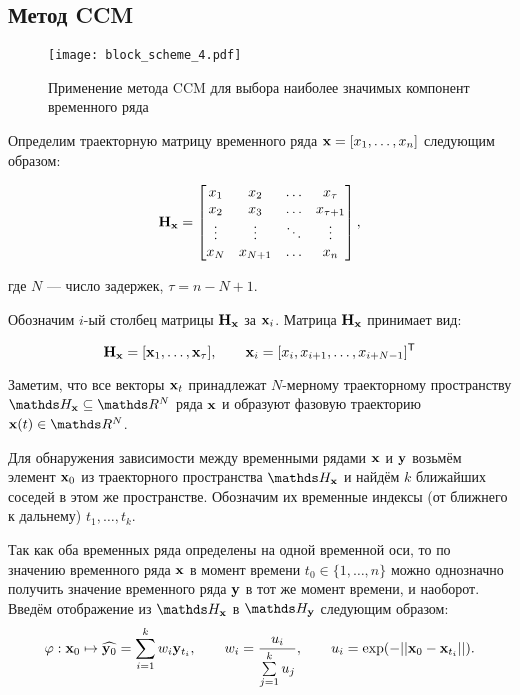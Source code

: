 \documentclass[a4paper, 12pt]{article}
\begin{document}
\subsection{Метод CCM}
\begin{figure}[bhtp]
	\texttt{[image: block\_scheme\_4.pdf]}
	\caption{Применение метода CCM для выбора наиболее значимых компонент временного ряда}
	\label{fig:schema}
\end{figure}

Определим траекторную матрицу временного ряда $\mathbf{x} = [x_1, \ldots, x_n]$ следующим образом: 

\begin{equation*} \label{eq:traj_mat}
	\mathbf{H}_{\mathbf{x}} = \begin{bmatrix}
		x_1 & x_2 & \ldots & x_{\tau} \\
		x_2 & x_3 & \ldots & x_{\tau+1} \\
		\vdots & \vdots & \ddots & \vdots \\
		x_{N} & x_{N+1} & \ldots & x_n
	\end{bmatrix}, 
\end{equation*} 

где $N$ --- число задержек, $\tau = n - N + 1$.

Обозначим $i\text{-ый}$ столбец матрицы $\mathbf{H}_{\mathbf{x}}$ за $\mathbf{x}_i$. 
Матрица $\mathbf{H}_{\mathbf{x}}$ принимает вид:

\begin{equation*} \label{eq:traj_mat_short}
	\mathbf{H}_{\mathbf{x}} = [\mathbf{x}_1, \ldots, \mathbf{x}_{\tau}], \qquad \mathbf{x}_i = [x_i, x_{i+1}, \ldots, x_{i+N-1}]^{\mathsf{T}} 
\end{equation*}

Заметим, что все векторы $\mathbf{x}_t$ принадлежат $N\text{-мерному}$ траекторному пространству $\dH_{\bx} \subseteq \dR^N$ ряда $\mathbf{x}$ и образуют фазовую траекторию $\bx(t) \in \dR^N$.

Для обнаружения зависимости между временными рядами $\mathbf{x}$ и $\mathbf{y}$ возьмём элемент $\mathbf{x}_0$ из траекторного пространства $\dH_{\bx}$ и найдём $k$ ближайших соседей в этом же пространстве. Обозначим их временные индексы (от ближнего к дальнему) $t_1, \ldots, t_k$.

Так как оба временных ряда определены на одной временной оси, то по значению временного ряда $\mathbf{x}$ в момент времени $t_0 \in \{ 1, \ldots, n\}$ можно однозначно получить значение временного ряда $\mathbf{y}$ в тот же момент времени, и наоборот. Введём отображение из $\dH_{\bx}$ в $\dH_{\by}$ следующим образом: 
$$ \varphi: \mathbf{x}_0 \mapsto \widehat{\mathbf{y}_0} = \sum\limits_{i=1}^k w_i \mathbf{y}_{t_i}, \qquad 
w_i = \dfrac{u_i}{\sum\limits_{j=1}^k u_j}, \qquad
u_i = \exp(-||\mathbf{x}_0 - \mathbf{x}_{t_i}||).$$
\end{document}

